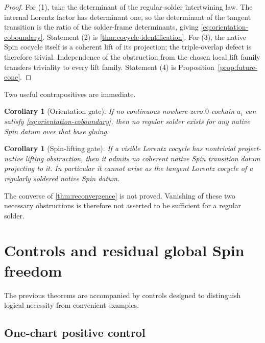 \documentclass[11pt,a4paper]{article}
\newtheorem{corollary}[theorem]{Corollary}
\theoremstyle{definition}
\theoremstyle{remark}
\begin{document}
\begin{proof}
For (1), take the determinant of the regular-solder intertwining law.
The internal Lorentz factor has determinant one, so the determinant of the
tangent transition is the ratio of the solder-frame determinants, giving
\eqref{eq:orientation-coboundary}.  Statement (2) is
\cref{thm:cocycle-identification}.  For (3), the native Spin cocycle itself
is a coherent lift of its projection; the triple-overlap defect is
therefore trivial.  Independence of the obstruction from the chosen local
lift family transfers triviality to every lift family.  Statement (4) is
Proposition~\ref{prop:future-cone}.
\end{proof}

Two useful contrapositives are immediate.

\begin{corollary}[Orientation gate]
\label{cor:orientation-gate}
If no continuous nowhere-zero \(0\)-cochain \(a_i\) can satisfy
\eqref{eq:orientation-coboundary}, then no regular solder exists for any native Spin datum over
that base gluing.
\end{corollary}

\begin{corollary}[Spin-lifting gate]
\label{cor:spin-gate}
If a visible Lorentz cocycle has nontrivial project-native lifting
obstruction, then it admits no coherent native Spin transition datum
projecting to it.  In particular it cannot arise as the tangent Lorentz
cocycle of a regularly soldered native Spin datum.
\end{corollary}

The converse of \cref{thm:reconvergence} is not proved.  Vanishing of these
two necessary obstructions is therefore not asserted to be sufficient for
a regular solder.

\clearpage
\section{Controls and residual global Spin freedom}
\label{sec:controls}

The previous theorems are accompanied by controls designed to distinguish
logical necessity from convenient examples.

\subsection{One-chart positive control}
\end{document}
